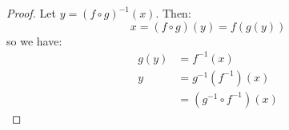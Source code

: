 \documentclass{article}
\begin{document}
\begin{itemize}
\begin{theorem}
\begin{equation}
            \label{eq:}
        \end{equation}
        \begin{proof}
            Let $y=(f\circ g)^{-1}(x)$. Then:
            \begin{equation}
                x = (f\circ g)(y) = f(g(y))
                \label{eq:}
            \end{equation}
            so we have:
            \begin{align}
                g(y) &= f^{-1}(x) \\ 
                y &= g^{-1}(f^{-1})(x) \\ 
                &= (g^{-1} \circ f^{-1})(x)
            \end{align}
        \end{proof}
    \end{theorem}
\end{itemize}
\end{document}

